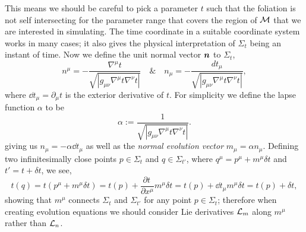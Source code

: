 This means we should be careful to pick a parameter $t$ such that the foliation is not self intersecting for the parameter range that covers the region of $\mathcal{M}$ that we are interested in simulating. The time coordinate in a suitable coordinate system works in many cases; it also gives the physical interpretation of $\Sigma_t$ being an instant of time. Now we define the unit normal vector $\boldsymbol{n}$ to $\Sigma_t$,
\begin{equation} n^\mu = -\frac{\nabla^\mu t}{\sqrt{|g_{\mu\nu}\nabla^\mu t \nabla^\nu t|}} \quad \& \quad  n_\mu = -\frac{dt_\mu}{\sqrt{|g_{\mu\nu}\nabla^\mu t \nabla^\nu t|}},\end{equation}
where $\dd t_\mu=\partial_\mu t$ is the exterior derivative of $t$.
For simplicity we define the lapse function $\alpha$ to be
\begin{equation}\alpha :=  \frac{1}{\sqrt{|g_{\mu\nu}\nabla^\mu t \nabla^\nu t|}}. \end{equation}
giving us $n_\mu = -\alpha \dd t_\mu$ as well as the {\it normal evolution vector} $m_\mu = \alpha n_\mu$. Defining two infinitesimally close points $p\in\Sigma_t$ and $q\in\Sigma_{t'}$, where $ q^\mu = p^\mu + m^\mu\delta t$ and $t' = t+ \delta t$, we see,
\begin{equation} t(q) = t(p^\mu +  m^\mu\delta t) = t(p) + \frac{\partial t^{\,}}{\partial x^\mu}m^\mu\delta t = t(p) + \dd t_\mu m^\mu \delta t =  t(p) + \delta t,\end{equation} 
showing that $m^\mu$ connects $\Sigma_t$ and $\Sigma_{t'}$ for any point $p\in \Sigma_t$; therefore when creating evolution equations we should consider Lie derivatives $\mathcal{L}_m$ along $m^\mu$ rather than $\mathcal{L}_n$.



